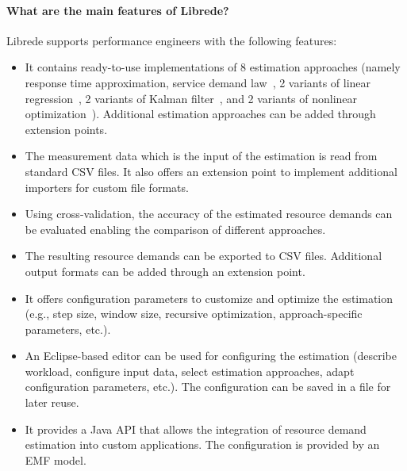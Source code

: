 \paragraph{What are the main features of Librede?} Librede supports performance engineers with the following features:
\begin{itemize}
\item It contains ready-to-use implementations of 8 estimation approaches (namely response time approximation, service demand law~\cite{Brosig_Huber_Kounev_2011}, 2 variants of linear regression~\cite{Rolia_Vetland_1995, Kraft2009}, 2 variants of Kalman filter~\cite{Wang_Huang_Qin_Zhang_Wei_Zhong_2012,Zheng_Woodside_Litoiu_2008}, and 2 variants of nonlinear optimization~\cite{Menasce_2008, Liu2006}). Additional estimation approaches can be added through extension points.
\item The measurement data which is the input of the estimation is read from standard CSV files. It also offers an extension point to implement additional importers for custom file formats.
\item Using cross-validation, the accuracy of the estimated resource demands can be evaluated enabling the comparison of different approaches.
\item The resulting resource demands can be exported to CSV files. Additional output formats can be added through an extension point.
\item It offers configuration parameters to customize and optimize the estimation (e.g., step size, window size, recursive optimization, approach-specific parameters, etc.).
\item An Eclipse-based editor can be used for configuring the estimation (describe workload, configure input data, select estimation approaches, adapt configuration parameters, etc.). The configuration can be saved in a file for later reuse.
\item It provides a Java API that allows the integration of resource demand estimation into custom applications. The configuration is provided by an EMF model.

\end{itemize}






